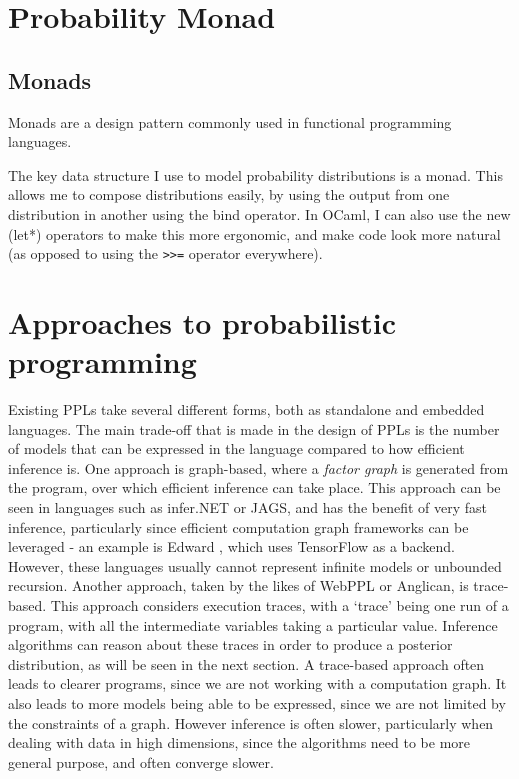 \section{Probability Monad}

\subsection{Monads}

Monads are a design pattern commonly used in functional programming languages.

The key data structure I use to model probability distributions is a monad. This allows me to compose distributions easily, by using the output from one distribution in another using the bind operator. In OCaml, I can also use the new (let*) operators to make this more ergonomic, and make code look more natural (as opposed to using the \texttt{>>=} operator everywhere).

\section{Approaches to probabilistic programming}
Existing PPLs take several different forms, both as standalone and embedded languages. The main trade-off that is made in the design of PPLs is the number of models that can be expressed in the language compared to how efficient inference is. One approach is graph-based, where a \textit{factor graph} is generated from the program, over which efficient inference can take place. This approach can be seen in languages such as infer.NET or JAGS, and has the benefit of very fast inference, particularly since efficient computation graph frameworks can be leveraged - an example is Edward \cite{edward}, which uses TensorFlow as a backend. However, these languages usually cannot represent infinite models or unbounded recursion. Another approach, taken by the likes of WebPPL or Anglican, is trace-based. This approach considers execution traces, with a `trace' being one run of a program, with all the intermediate variables taking a particular value. Inference algorithms can reason about these traces in order to produce a posterior distribution, as will be seen in the next section. A trace-based approach often leads to clearer programs, since we are not working with a computation graph. It also leads to more models being able to be expressed, since we are not limited by the constraints of a graph. However inference is often slower, particularly when dealing with data in high dimensions, since the algorithms need to be more general purpose, and often converge slower.

